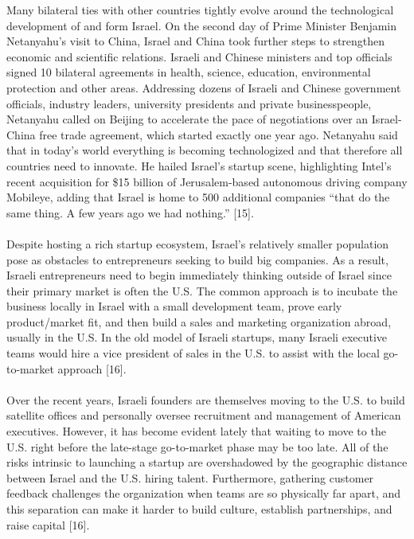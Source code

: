 \documentclass[10pt]{article}
\begin{document}
Many bilateral ties with other countries tightly evolve around the technological development of and form Israel. On the second day of Prime Minister Benjamin Netanyahu’s visit to China, Israel and China took further steps to strengthen economic and scientific relations. Israeli and Chinese ministers and top officials signed 10 bilateral agreements in health, science, education, environmental protection and other areas. Addressing dozens of Israeli and Chinese government officials, industry leaders, university presidents and private businesspeople, Netanyahu called on Beijing to accelerate the pace of negotiations over an Israel-China free trade agreement, which started exactly one year ago. Netanyahu said that in today’s world everything is becoming technologized and that therefore all countries need to innovate. He hailed Israel’s startup scene, highlighting Intel’s recent acquisition for \$15 billion of Jerusalem-based autonomous driving company Mobileye, adding that Israel is home to 500 additional companies “that do the same thing. A few years ago we had nothing.” [15].
\\
\\
Despite hosting a rich startup ecosystem, Israel's relatively smaller population pose as obstacles to entrepreneurs seeking to build big companies. As a result, Israeli entrepreneurs need to begin immediately thinking outside of Israel since their primary market is often the U.S. The common approach is to incubate the business locally in Israel with a small development team, prove early product/market fit, and then build a sales and marketing organization abroad, usually in the U.S. In the old model of Israeli startups, many Israeli executive teams would hire a vice president of sales in the U.S. to assist with the local go-to-market approach [16].
\\
\\
Over the recent years, Israeli founders are themselves moving to the U.S. to build satellite offices and personally oversee recruitment and management of American executives. However, it has become evident lately that waiting to move to the U.S. right before the late-stage go-to-market phase may be too late. All of the risks intrinsic to launching a startup are overshadowed by the geographic distance between Israel and the U.S. hiring talent. Furthermore, gathering customer feedback challenges the organization when teams are so physically far apart, and this separation can make it harder to build culture, establish partnerships, and raise capital [16].
\\
\end{document}
